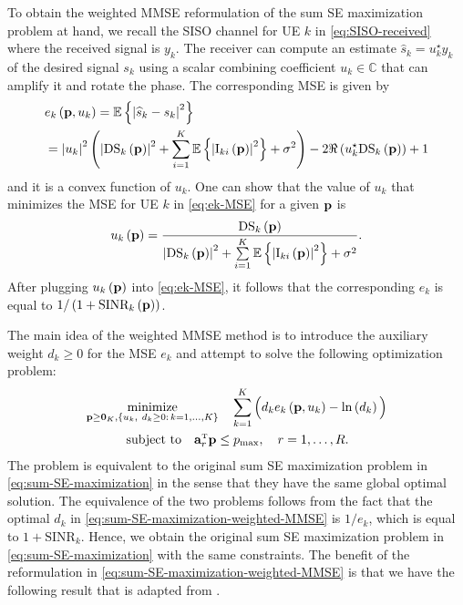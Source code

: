 To obtain the weighted MMSE reformulation of the sum SE maximization problem at hand, we recall the \gls{SISO} channel for UE $k$ in \eqref{eq:SISO-received} where the received signal is $y_k$. The receiver can compute an estimate $\widehat{s}_{k}=u_{k}^{\star}y_{k}$ of the desired signal $s_{k}$ using a scalar combining coefficient $u_{k} \in\mathbb{C}$ that can amplify it and rotate the phase. The corresponding \gls{MSE} is given by
\begin{align} \nonumber
&e_k\left(\mathbf{p}, u_k\right)=\mathbb{E}\left\{\left|\widehat{s}_{k}-s_{k}\right|^2\right\} \\
&=\left|u_{k}\right|^2\left(\left|\textrm{DS}_{k}\left(\mathbf{p}\right)\right|^2+\sum\limits_{i=1}^K\mathbb{E}\left\{\left|\textrm{I}_{ki}\left(\mathbf{p}\right)\right|^2\right\}+\sigma^2\right) -2\Re\left(u_{k}^{\star}\textrm{DS}_{k}\left(\mathbf{p}\right)\right)+1  \label{eq:ek-MSE}
\end{align}
and it is a convex function of $u_k$. One can show that the value of $u_k$ that minimizes the MSE for UE $k$ in \eqref{eq:ek-MSE} for a given $\mathbf{p}$ is 
\begin{align} \label{eq:uk}
u_{k}\left(\mathbf{p}\right)=\frac{\textrm{DS}_{k}\left(\mathbf{p}\right)}{\left|\textrm{DS}_{k}\left(\mathbf{p}\right)\right|^2+\sum\limits_{i=1}^K\mathbb{E}\left\{\left|\textrm{I}_{ki}\left(\mathbf{p}\right)\right|^2\right\}+\sigma^2}.
\end{align} 
After plugging $u_{k}\left(\mathbf{p}\right)$ into \eqref{eq:ek-MSE}, it follows that the corresponding $e_k$ is equal to $1/\left(1+\textrm{SINR}_{k}\left(\mathbf{p}\right)\right)$. 

The main idea of the weighted MMSE method is to introduce the auxiliary weight $d_{k}\geq 0$ for the MSE $e_{k}$ and attempt to solve the following optimization problem:
\begin{align} \label{eq:sum-SE-maximization-weighted-MMSE} 
&\underset{\vect{p} \geq \vect{0}_K,  \left\{u_{k}, \ d_{k}\geq 0 : \, k=1,\ldots,K\right\}}{\textrm{minimize}} \quad \sum_{k=1}^K\Big(d_{k}e_{k}\left(\vect{p},u_k\right)-\ln\left( d_{k}\right)\Big)  \\
&\hspace{1.1cm}\textrm{subject to} \quad \vect{a}_r^{\Ttran}\vect{p}\leq p_{\textrm{max}}, \quad r=1,\ldots,R. \nonumber
\end{align}
The problem is equivalent to the original sum SE maximization problem in \eqref{eq:sum-SE-maximization} in the sense that they have the same global optimal solution.
The equivalence of the two problems follows from the fact that the optimal $d_{k}$ in \eqref{eq:sum-SE-maximization-weighted-MMSE} is $1/e_{k}$, which is equal to $1+\textrm{SINR}_{k}$. Hence, we obtain the original sum SE maximization problem  in \eqref{eq:sum-SE-maximization} with the same constraints. The benefit of the reformulation in \eqref{eq:sum-SE-maximization-weighted-MMSE} is that we have the following result that is adapted from \cite[Theorem 3]{Shi2011}.



